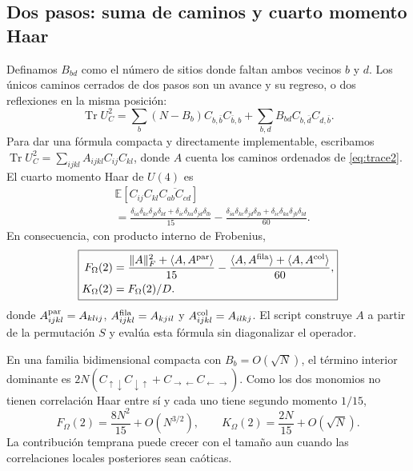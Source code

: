 \documentclass[11pt]{article}
\newcommand{\Tr}{\operatorname{Tr}}
\newcommand{\E}{\mathbb{E}}
\begin{document}
\subsection{Dos pasos: suma de caminos y cuarto momento Haar}
Definamos $B_{bd}$ como el número de sitios donde faltan ambos vecinos
$b$ y $d$. Los únicos caminos cerrados de dos pasos son un avance y
su regreso, o dos reflexiones en la misma posición:
\begin{equation}
 \Tr U_C^2=\sum_b (N-B_b)C_{b,\bar b}C_{\bar b,b}
       +\sum_{b,d}B_{bd}C_{b,\bar d}C_{d,\bar b}.
 \label{eq:trace2}
\end{equation}
Para dar una fórmula compacta y directamente implementable, escribamos
$\Tr U_C^2=\sum_{ijkl}A_{ijkl}C_{ij}C_{kl}$, donde $A$ cuenta los
caminos ordenados de \eqref{eq:trace2}. El cuarto momento Haar de $U(4)$ es
\begin{align}
 &\E[C_{ij}C_{kl}\overline{C_{ab}C_{cd}}]\nonumber\\
 &=\frac{\delta_{ia}\delta_{kc}\delta_{jb}\delta_{ld}
             +\delta_{ic}\delta_{ka}\delta_{jd}\delta_{lb}}{15}
 -\frac{\delta_{ia}\delta_{kc}\delta_{jd}\delta_{lb}
             +\delta_{ic}\delta_{ka}\delta_{jb}\delta_{ld}}{60}.
\end{align}
En consecuencia, con producto interno de Frobenius,
\begin{equation}
 \boxed{\begin{aligned}F_\Omega(2)&=
 \frac{\|A\|_F^2+\langle A,A^{\rm par}\rangle}{15}
 -\frac{\langle A,A^{\rm fila}\rangle+
         \langle A,A^{\rm col}\rangle}{60},\\
 K_\Omega(2)&=F_\Omega(2)/D.\end{aligned}}
\end{equation}
donde $A^{\rm par}_{ijkl}=A_{klij}$,
$A^{\rm fila}_{ijkl}=A_{kjil}$ y $A^{\rm col}_{ijkl}=A_{ilkj}$.
El script construye $A$ a partir de la permutación $S$ y evalúa esta
fórmula sin diagonalizar el operador.

En una familia bidimensional compacta con $B_b=O(\sqrt N)$,
el término interior dominante es
$2N(C_{\uparrow\downarrow}C_{\downarrow\uparrow}
    +C_{\rightarrow\leftarrow}C_{\leftarrow\rightarrow})$.
Como los dos monomios no tienen correlación Haar entre sí y cada uno
tiene segundo momento $1/15$,
\begin{equation}
 F_\Omega(2)=\frac{8N^2}{15}+O(N^{3/2}),\qquad
 K_\Omega(2)=\frac{2N}{15}+O(\sqrt N).
\end{equation}
La contribución temprana puede crecer con el tamaño aun cuando las
correlaciones locales posteriores sean caóticas.
\end{document}

